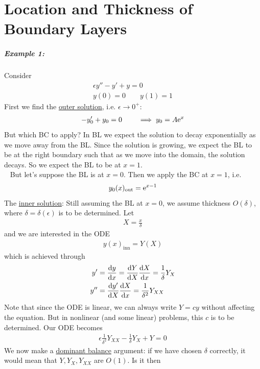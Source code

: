 \chapter{Location and Thickness of Boundary Layers}
\paragraph{Example 1:} Consider
\begin{gather*}
	\epsilon y'' - y' + y = 0 \\
	y(0) = 0 \qquad y(1) = 1
\end{gather*}
First we find the \underline{outer solution}, i.e. $\epsilon \rightarrow 0^+$:
\begin{gather*}
	-y_0' + y_0 = 0 \qquad \implies y_0 = A \mathrm{e}^x
\end{gather*}
But which BC to apply? In BL we expect the solution to decay exponentially as we move away from the BL. Since the solution is growing, we expect the BL to be at the right boundary such that as we move into the domain, the solution decays. So we expect the BL to be at $x=1$. \\
\ \newline 
But let's suppose the BL is at $x=0$. Then we apply the BC at $x=1$, i.e.
\begin{gather*}
	y_0(x)_\text{out} = \mathrm{e}^{x-1}
\end{gather*}
The \underline{inner solution}: Still assuming the BL at $x=0$, we assume thickness $O(\delta)$, where $\delta = \delta(\epsilon)$ is to be determined. Let 
\begin{gather*}
	X = \frac{x}{\delta}
\end{gather*}
and we are interested in the ODE
\begin{gather*}
	y(x)_\text{inn} = Y(X)
\end{gather*}
which is achieved through
\begin{align*}
	y' &= \frac{\mathrm{d} y}{\mathrm{d} x} = \frac{\mathrm{d} Y}{\mathrm{d} X} \frac{\mathrm{d} X}{\mathrm{d} x} = \frac{1}{\delta} Y_X \\
	y'' &= \frac{\mathrm{d} y'}{\mathrm{d} X} \frac{\mathrm{d} X}{\mathrm{d} x} = \frac{1}{\delta^2} Y_{XX}
\end{align*}
Note that since the ODE is linear, we can always write $Y = c y$ without affecting the equation. But in nonlinear (and some linear) problems, this $c$ is to be determined. Our ODE becomes
\begin{gather*}
	\epsilon \frac{1}{\delta^2} Y_{XX} - \frac{1}{\delta} Y_X + Y = 0
\end{gather*}
We now make a \underline{dominant balance} argument: if we have chosen $\delta$ correctly, it would mean that $Y,Y_X,Y_{XX}$ are $O(1)$. Is it then

